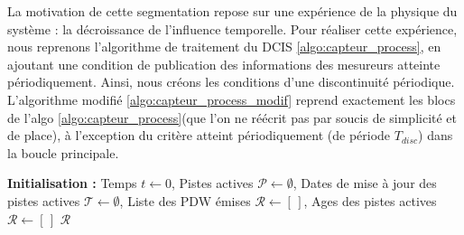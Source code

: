 La motivation de cette segmentation repose sur une expérience de la physique du système : la décroissance de l'influence temporelle. Pour réaliser cette expérience, nous reprenons l'algorithme de traitement du DCIS \ref{algo:capteur_process}, en ajoutant une condition de publication des informations des mesureurs atteinte périodiquement. Ainsi, nous créons les conditions d'une discontinuité périodique. L'algorithme modifié \ref{algo:capteur_process_modif} reprend exactement les blocs de l'algo \ref{algo:capteur_process}(que l'on ne réécrit pas par soucis de simplicité et de place), à l'exception du critère atteint périodiquement (de période $T_{disc}$) dans la boucle principale.

\begin{algorithm}[httb]
\DontPrintSemicolon
\SetAlgoLined
{}
\textbf{Initialisation :} Temps $t \leftarrow 0$, Pistes actives $\mathcal{P} \leftarrow \emptyset$, Dates de mise à jour des pistes actives $\mathcal{T} \leftarrow \emptyset$, Liste des PDW émises $\mathcal{R} \leftarrow [\,]$, Ages des pistes actives $\mathcal{R} \leftarrow [\,]$\;
\vspace{2mm}
\Return $\mathcal{R}$
\caption{Algorithme d'acquisition, de suivi et de publication des PDW modifié, permettant de faire apparaitre des discontinuités dans le suivi.}
\label{algo:capteur_process_modif}
\end{algorithm}

